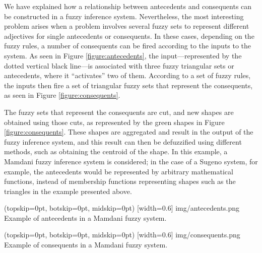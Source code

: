 We have explained how a relationship between antecedents and
consequents can be constructed in a fuzzy inference
system. Nevertheless, the most interesting problem arises when a
problem involves several fuzzy sets to represent different adjectives
for single antecedents or consequents. In these cases, depending on
the fuzzy rules, a number of consequents can be fired according to the
inputs to the system. As seen in Figure \ref{figure:antecedents}, the
input---represented by the dotted vertical black line---is associated
with three fuzzy triangular sets or antecedents, where it
``activates'' two of them. According to a set of fuzzy rules, the
inputs then fire a set of triangular fuzzy sets that represent the
consequents, as seen in Figure \ref{figure:consequents}.

The fuzzy sets that represent the consequents are cut, and new shapes
are obtained using those cuts, as represented by the green shapes in
Figure \ref{figure:consequents}. These shapes are aggregated and
result in the output of the fuzzy inference system, and this result
can then be defuzzified using different methods, such as obtaining the
centroid of the shape. In this example, a Mamdani fuzzy inference
system is considered; in the case of a Sugeno system, for example, the
antecedents would be represented by arbitrary mathematical functions,
instead of membership functions representing shapes such as the
triangles in the example presented above.

\Figure[](topskip=0pt, botskip=0pt, midskip=0pt)
[width=0.6\linewidth]
{img/antecedents.png}
{Example of antecedents in a Mamdani fuzzy system.
  \label{figure:antecedents}}

\Figure[](topskip=0pt, botskip=0pt, midskip=0pt)
[width=0.6\linewidth]
{img/consequents.png}
{Example of consequents in a Mamdani fuzzy system.
  \label{figure:consequents}}